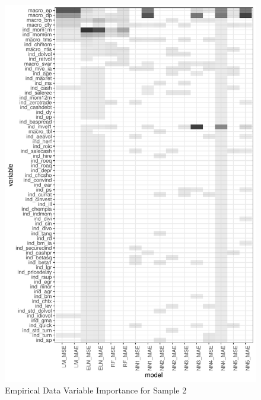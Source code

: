 \documentclass[a4paper, table]{article}
\begin{document}
\begin{figure}
	\includegraphics{empirical_sample_2_vi.pdf}
	\caption{Empirical Data Variable Importance for Sample 2}
\end{figure}
\end{document}
